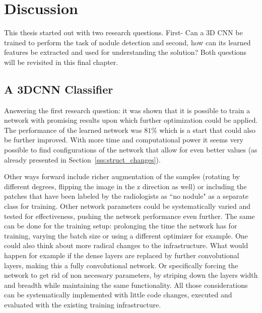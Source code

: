 \documentclass[main.tex]{subfiles}
\begin{document}
\chapter{Discussion}\label{chap:discussion}
This thesis started out with two research questions. First- Can a 3D CNN be trained to perform the task of nodule detection and second, how can its learned features be extracted and used for understanding the solution? Both questions will be revisited in this final chapter.

\section{A 3DCNN Classifier}
Answering the first research question: it was shown that it is possible to train a network with promising results upon which further optimization could be applied. The performance of the learned network was $81\%$ which is a start that could also be further improved. With more time and computational power it seems very possible to find configurations of the network that allow for even better values (as already presented in Section~\ref{sss:struct_changes}). 

Other ways forward include richer augmentation of the samples (rotating by different degrees, flipping the image in the z direction as well) or including the patches that have been labeled by the radiologists as ``no nodule" as a separate class for training. Other network parameters could be systematically varied and tested for effectiveness, pushing the network performance even further. The same can be done for the training setup: prolonging the time the network has for training, varying the batch size or using a different optimizer for example. One could also think about more radical changes to the infrastructure. What would happen for example if the dense layers are replaced by further convolutional layers, making this a fully convolutional network. Or specifically forcing the network to get rid of non necessary parameters, by striping down the layers width and breadth while maintaining the same functionality. All those considerations can be systematically implemented with little code changes, executed and evaluated with the existing training infrastructure.
\end{document}
